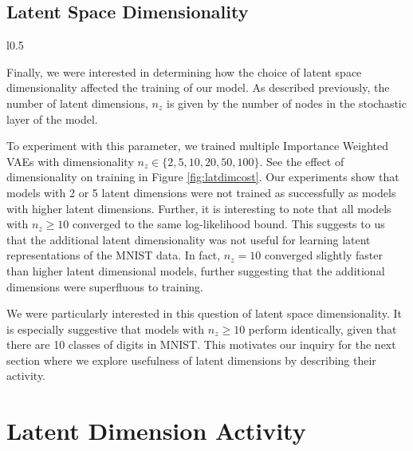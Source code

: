 \documentclass{article} %
\numberwithin{figure}{section}
\begin{document}
\subsection{Latent Space Dimensionality}
\begin{wrapfigure}{l}{0.5\textwidth}
  \resizebox{\linewidth}{!}{}
  \caption{Latent Dimensionality}
  \label{fig:latdimcost}
\end{wrapfigure}
Finally, we were interested in determining how the choice of latent space dimensionality affected the training of our model. As described previously, the number of latent dimensions, $n_z$ is given by the number of nodes in the stochastic layer of the model.
\par To experiment with this parameter, we trained multiple Importance Weighted VAEs with dimensionality ${n_z \in \{2,5,10,20,50,100\}}$. See the effect of dimensionality on training in Figure \ref{fig:latdimcost}. Our experiments show that models with 2 or 5 latent dimensions were not trained as successfully as models with higher latent dimensions. Further, it is interesting to note that all models with $n_z\geq10$ converged to the same log-likelihood bound. This suggests to us that the additional latent dimensionality was not useful for learning latent representations of the MNIST data. In fact, $n_z=10$ converged slightly faster than higher latent dimensional models, further suggesting that the additional dimensions were superfluous to training.
\par We were particularly interested in this question of latent space dimensionality. It is especially suggestive that models with $n_z\geq10$ perform identically, given that there are 10 classes of digits in MNIST. This motivates our inquiry for the next section where we explore usefulness of latent dimensions by describing their activity.

\section{Latent Dimension Activity}
\end{document}
